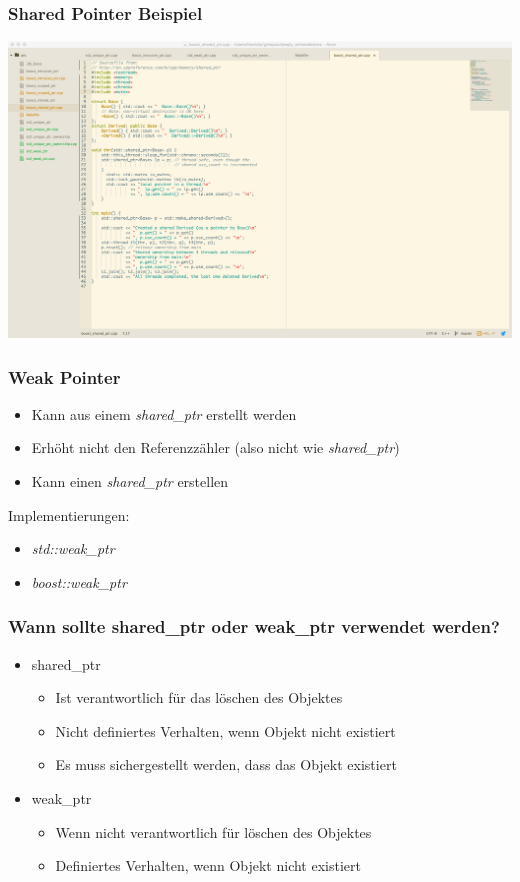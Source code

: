\documentclass{beamer}
\begin{document}
\begin{frame}[fragile]
  \frametitle{Shared Pointer Beispiel}
  \includegraphics[scale=.2]{shared_ptr_usage}
\end{frame}

\begin{frame}[fragile]
 \frametitle{Weak Pointer}
 \begin{itemize}
  \item Kann aus einem \textit{shared\_ptr} erstellt werden
  \item Erhöht nicht den Referenzzähler (also nicht wie \textit{shared\_ptr})
  \item Kann einen \textit{shared\_ptr} erstellen %
 \end{itemize}
 Implementierungen:
 \begin{itemize}
 	\item \textit{std::weak\_ptr}
 	\item \textit{boost::weak\_ptr}
 \end{itemize}
\end{frame}

\begin{frame}
 \frametitle{Wann sollte shared\_ptr oder weak\_ptr verwendet werden?}
 \begin{itemize}
  \item shared\_ptr
  \begin{itemize}
   \item Ist verantwortlich für das löschen des Objektes
   \item Nicht definiertes Verhalten, wenn Objekt nicht existiert
   \item Es muss sichergestellt werden, dass das Objekt existiert
  \end{itemize}
  \item weak\_ptr
  \begin{itemize}
   \item Wenn nicht verantwortlich für löschen des Objektes
   \item Definiertes Verhalten, wenn Objekt nicht existiert
  \end{itemize}
 \end{itemize}
\end{frame}
\end{document}
